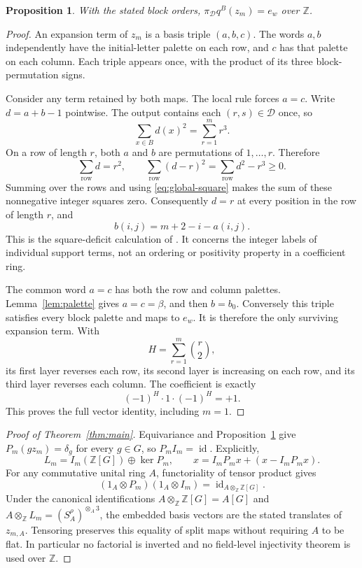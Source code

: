 \documentclass[11pt]{article}
\newcommand{\Z}{\mathbb Z}
\newcommand{\id}{\operatorname{id}}
\newtheorem{proposition}[theorem]{Proposition}
\numberwithin{equation}{section}
\begin{document}
\begin{proposition}\label{prop:unit}
With the stated block orders, $\pi_{\mathcal D}q^B(z_m)=e_w$ over $\Z$.
\end{proposition}
\begin{proof}
An expansion term of $z_m$ is a basis triple $(a,b,c)$. The words $a,b$ independently have the initial-letter palette on each row, and $c$ has that palette on each column. Each triple appears once, with the product of its three block-permutation signs.

Consider any term retained by both maps. The local rule forces $a=c$. Write $d=a+b-1$ pointwise. The output contains each $(r,s)\in\mathcal D$ once, so
\begin{equation}\label{eq:global-square}
 \sum_{x\in B}d(x)^2=\sum_{r=1}^m r^3.
\end{equation}
On a row of length $r$, both $a$ and $b$ are permutations of $1,\ldots,r$. Therefore
\begin{equation}\label{eq:deficit}
 \sum_{\text{row}}d=r^2,\qquad
 \sum_{\text{row}}(d-r)^2=\sum_{\text{row}}d^2-r^3\ge0.
\end{equation}
Summing over the rows and using \eqref{eq:global-square} makes the sum of these nonnegative integer squares zero. Consequently $d=r$ at every position in the row of length $r$, and
\[
 b(i,j)=m+2-i-a(i,j).
\]
This is the square-deficit calculation of \cite[Section~3, \texttt{dom:square-minimum}]{OAI}. It concerns the integer labels of individual support terms, not an ordering or positivity property in a coefficient ring.

The common word $a=c$ has both the row and column palettes. Lemma~\ref{lem:palette} gives $a=c=\beta$, and then $b=b_0$. Conversely this triple satisfies every block palette and maps to $e_w$. It is therefore the only surviving expansion term. With
\[
 H=\sum_{r=1}^m\binom r2,
\]
its first layer reverses each row, its second layer is increasing on each row, and its third layer reverses each column. The coefficient is exactly
\[
 (-1)^H\cdot1\cdot(-1)^H=+1.
\]
This proves the full vector identity, including $m=1$.
\end{proof}

\begin{proof}[Proof of Theorem~\ref{thm:main}]
Equivariance and Proposition~\ref{prop:unit} give $P_m(gz_m)=\delta_g$ for every $g\in G$, so $P_mI_m=\id$. Explicitly,
\[
 L_m=I_m(\Z[G])\oplus\ker P_m,\qquad
 x=I_mP_mx+(x-I_mP_mx).
\]
For any commutative unital ring $A$, functoriality of tensor product gives
\[
 (1_A\otimes P_m)(1_A\otimes I_m)=\id_{A\otimes_{\Z}\Z[G]}.
\]
Under the canonical identifications $A\otimes_{\Z}\Z[G]=A[G]$ and
$A\otimes_{\Z}L_m=(S^\rho_A)^{\otimes_A3}$, the embedded basis vectors are the stated translates of $z_{m,A}$. Tensoring preserves this equality of split maps without requiring $A$ to be flat. In particular no factorial is inverted and no field-level injectivity theorem is used over $\Z$.
\end{proof}
\end{document}
